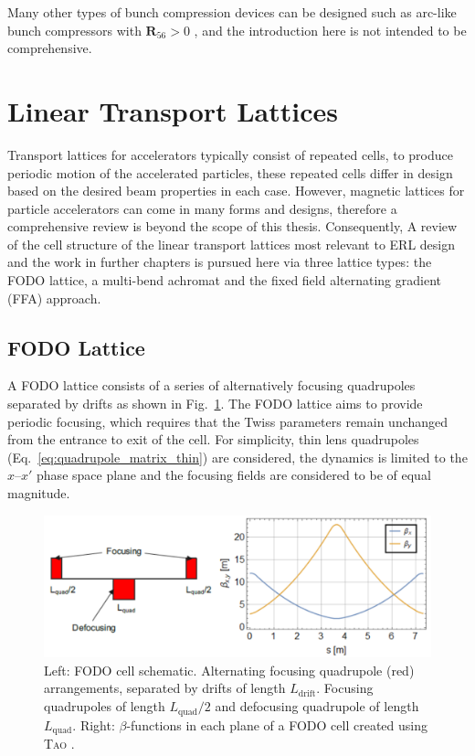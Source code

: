 \documentclass[../main.tex]{subfiles}
\begin{document}
Many other types of bunch compression devices can be designed such as arc-like bunch compressors \cite{williams2020arclike} with $\boldsymbol{R}_{56}>0$ , and the introduction here is not intended to be comprehensive. 

\section{Linear Transport Lattices}

Transport lattices for accelerators typically consist of repeated cells, to produce periodic motion of the accelerated particles, these repeated cells differ in design based on the desired beam properties in each case. However, magnetic lattices for particle accelerators can come in many forms and designs, therefore a comprehensive review is beyond the scope of this thesis. Consequently, A review of the cell structure of the linear transport lattices most relevant to ERL design and the work in further chapters is pursued here via three lattice types: the FODO lattice, a multi-bend achromat and the fixed field alternating gradient (FFA) approach. 

\subsection{FODO Lattice}
\label{sec:FODO_lattice}

A FODO lattice consists of a series of alternatively focusing quadrupoles separated by drifts as shown in Fig.~\ref{fig:FODO_cell}. The FODO lattice aims to provide periodic focusing, which requires that the Twiss parameters remain unchanged from the entrance to exit of the cell. For simplicity, thin lens quadrupoles (Eq.~\ref{eq:quadrupole_matrix_thin}) are considered, the dynamics is limited to the $x$--$x'$ phase space plane and the focusing fields are considered to be of equal magnitude.

\begin{figure}[!h]
\centering
\includegraphics[width=\textwidth]{Figures/Energy_Recovery_Linac_Design/FODO_cell_finished.pdf}
\caption{Left: FODO cell schematic. Alternating focusing quadrupole (red) arrangements, separated by drifts of length $L_{\mathrm{drift}}$. Focusing quadrupoles of length $L_{\mathrm{quad}}/2$ and defocusing quadrupole of length $L_{\mathrm{quad}}$. Right: $\beta$-functions in each plane of a FODO cell created using \textsc{Tao} \cite{TaoManual}.}
\label{fig:FODO_cell}
\end{figure}
\end{document}
